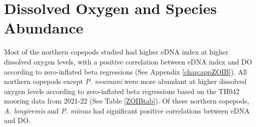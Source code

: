 \documentclass[12pt,twoside]{reedthesis}
\begin{document}
	
	\section{Dissolved Oxygen and Species Abundance}  
	
	Most of the northern copepods studied had higher eDNA index at higher dissolved oxygen levels, with a positive correlation between eDNA index and DO according to zero-inflated beta regressions (See Appendix \ref{chap:appZOIB}). All northern copepods except \textit{P. newmani} were more abundant at higher dissolved oxygen levels according to zero-inflated beta regressions based on the TH042 mooring data from 2021-22 (See Table \ref{ZOIBtab}). Of these northern copepods, \textit{A. longiremis} and \textit{P. mimus} had significant positive correlations between eDNA and DO. 
	
\end{document}
